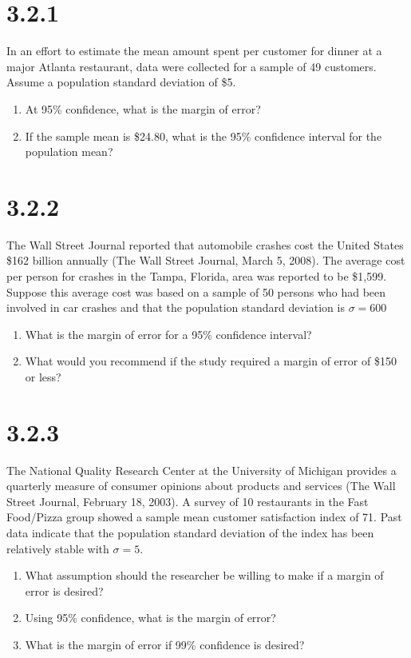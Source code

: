 \documentclass{article}
\begin{document}
\section*{3.2.1}
In an effort to estimate the mean amount spent per customer for dinner at a major Atlanta restaurant, data were collected for a sample of 49 customers. Assume a population standard deviation of \$5.
\begin{enumerate}
  \item At 95\% confidence, what is the margin of error?
  \item If the sample mean is \$24.80, what is the 95\% confidence interval for the population mean?
\end{enumerate}

\section*{3.2.2}
The Wall Street Journal reported that automobile crashes cost the United States \$162 billion annually (The Wall Street Journal, March 5, 2008). The average cost per person for crashes in the Tampa, Florida, area was reported to be \$1,599. Suppose this average cost was based on a sample of 50 persons who had been involved in car crashes and that the population standard deviation is $\sigma = 600$
\begin{enumerate}
  \item What is the margin of error for a 95\% confidence interval?
  \item What would you recommend if the study required a margin of error of \$150 or less?
\end{enumerate}

\section*{3.2.3}
The National Quality Research Center at the University of Michigan provides a quarterly measure of consumer opinions about products and services (The Wall Street Journal, February 18, 2003). A survey of 10 restaurants in the Fast Food/Pizza group showed a sample mean customer satisfaction index of 71. Past data indicate that the population standard deviation of the index has been relatively stable with $\sigma = 5$.
\begin{enumerate}
  \item What assumption should the researcher be willing to make if a margin of error is desired?
  \item Using 95\% confidence, what is the margin of error?
  \item What is the margin of error if 99\% confidence is desired?
\end{enumerate}
\end{document}
